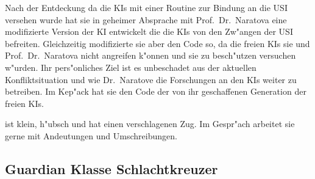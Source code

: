 \begin{figure}
    \caption{\ml{}}
\end{figure}

Nach der Entdeckung da\3 die KIs mit einer Routine zur Bindung an die USI versehen wurde hat sie in geheimer Absprache mit Prof.~Dr.~Naratova eine modifizierte Version der KI entwickelt die die KIs von den Zw"angen der USI befreiten. Gleichzeitig modifizierte sie aber den Code so, da\3 die freien KIs sie und Prof.~Dr.~Naratova nicht angreifen k"onnen und sie zu besch"utzen versuchen w"urden. Ihr pers"onliches Ziel ist es unbeschadet aus der aktuellen Konfliktsituation und wie Dr.~Naratove die Forschungen an den KIs weiter zu betreiben. Im Kep"ack hat sie den Code der von ihr geschaffenen Generation der freien KIs.

\ml{} ist klein, h"ubsch und hat einen verschlagenen Zug. Im Gespr"ach arbeitet sie gerne mit Andeutungen und Umschreibungen.

\subsection{Guardian Klasse Schlachtkreuzer}

